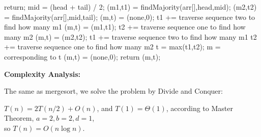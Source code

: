 \documentclass{article}
\begin{document}
\begin{algorithm}[H]
	\begin{algorithmic}[1]
		\State return;
		\EndIf
		\State mid = (head + tail) / 2;
		\State (m1,t1) = findMajority(arr[],head,mid);
		\State (m2,t2) = findMajority(arr[],mid,tail);
		\State (m,t) = (none,0);
		\EndIf
		\State t1 += traverse sequence two to find how many m1
		\State (m,t) = (m1,t1);
		\EndIf
		\State t2 += traverse sequence one to find how many m2
		\State (m,t) = (m2,t2);
		\EndIf
		\State t1 += traverse sequence two to find how many m1
		\State t2 += traverse sequence one to find how many m2
		\State t = max(t1,t2);
		\State m = corresponding to t
		\EndIf
		\State (m,t) = (none,0);
		\EndIf
		\State return (m,t);
		\EndFunction
	\end{algorithmic}
\end{algorithm}

\textbf{Complexity Analysis:}

The same as mergesort, we solve the problem by Divide and Conquer:

$T(n)=2T(n/2)+O(n)$, and $T(1)=\Theta(1)$,
according to Master Theorem, $a=2,b=2,d=1$, \\so $T(n)=O(n\log n)$.
\end{document}
